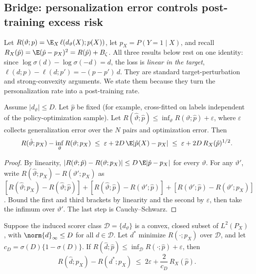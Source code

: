 \subsection{Bridge: personalization error controls post-training excess risk}

Let $R(\vartheta;p)=\E_X\,\ell(d_\vartheta(X);p(X))$, let $p_X=P(Y=1\mid X)$, and recall
$R_X(\hat p)=\E(\hat p-p_X)^2=R(\hat p)+B_\zeta$. All three results below rest on one identity: since
$\log\sigma(d)-\log\sigma(-d)=d$, the loss is \emph{linear in the target},
$\ell(d;p)-\ell(d;p')=-(p-p')\,d$. They are standard target-perturbation and strong-convexity
arguments. We state them because they turn the personalization rate into a post-training rate.

\begin{proposition}
\label{prop:bridge}
Assume $|d_\vartheta|\le D$. Let $\hat p$ be fixed (for example, cross-fitted on labels independent
of the policy-optimization sample). Let
$R(\hat\vartheta;\hat p)\le\inf_\vartheta R(\vartheta;\hat p)+\varepsilon$, where $\varepsilon$ collects
generalization error over the $N$ pairs and optimization error. Then
\[
  R(\hat\vartheta;p_X)-\inf_\vartheta R(\vartheta;p_X)\;\le\;\varepsilon+2D\,\E|\hat p(X)-p_X|
  \;\le\;\varepsilon+2D\,R_X(\hat p)^{1/2}.
\]
\end{proposition}

\begin{proof}
By linearity, $|R(\vartheta;\hat p)-R(\vartheta;p_X)|\le D\,\E|\hat p-p_X|$ for every $\vartheta$. For
any $\vartheta'$, write $R(\hat\vartheta;p_X)-R(\vartheta';p_X)$ as
$[R(\hat\vartheta;p_X)-R(\hat\vartheta;\hat p)]+[R(\hat\vartheta;\hat p)-R(\vartheta';\hat p)]
+[R(\vartheta';\hat p)-R(\vartheta';p_X)]$. Bound the first and third brackets by linearity and the
second by $\varepsilon$, then take the infimum over $\vartheta'$. The last step is Cauchy--Schwarz.
\end{proof}

\begin{proposition}
\label{prop:qg}
Suppose the induced scorer class $\mathcal D=\{d_\vartheta\}$ is a convex, closed subset of
$L^2(P_X)$, with $\norm{d}_\infty\le D$ for all $d\in\mathcal D$. Let $d^{*}$ minimize $R(\cdot;p_X)$
over $\mathcal D$, and let $c_D=\sigma(D)\{1-\sigma(D)\}$. If
$R(\hat d;\hat p)\le\inf_{\mathcal D}R(\cdot;\hat p)+\varepsilon$, then
\[
  R(\hat d;p_X)-R(d^{*};p_X)\;\le\;2\varepsilon+\frac{2}{c_D}\,R_X(\hat p).
\]
\end{proposition}

